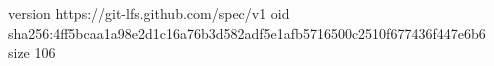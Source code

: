 version https://git-lfs.github.com/spec/v1
oid sha256:4ff5bcaa1a98e2d1c16a76b3d582adf5e1afb5716500c2510f677436f447e6b6
size 106
